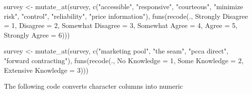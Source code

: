 \documentclass[
]{article}
\newenvironment{Shaded}{\begin{snugshade}}{\end{snugshade}}
\newcommand{\AttributeTok}[1]{\textcolor[rgb]{0.77,0.63,0.00}{#1}}
\newcommand{\DecValTok}[1]{\textcolor[rgb]{0.00,0.00,0.81}{#1}}
\newcommand{\FunctionTok}[1]{\textcolor[rgb]{0.00,0.00,0.00}{#1}}
\newcommand{\NormalTok}[1]{#1}
\newcommand{\OtherTok}[1]{\textcolor[rgb]{0.56,0.35,0.01}{#1}}
\newcommand{\StringTok}[1]{\textcolor[rgb]{0.31,0.60,0.02}{#1}}
\begin{document}
\begin{Shaded}
\begin{Highlighting}[]
\NormalTok{survey }\OtherTok{\textless{}{-}} \FunctionTok{mutate\_at}\NormalTok{(survey, }\FunctionTok{c}\NormalTok{(}\StringTok{"accessible"}\NormalTok{, }\StringTok{"responsive"}\NormalTok{, }\StringTok{"courteous"}\NormalTok{,}
    \StringTok{"minimize risk"}\NormalTok{, }\StringTok{"control"}\NormalTok{, }\StringTok{"reliability"}\NormalTok{, }\StringTok{"price information"}\NormalTok{),}
    \FunctionTok{funs}\NormalTok{(}\FunctionTok{recode}\NormalTok{(., }\StringTok{\textasciigrave{}}\AttributeTok{Strongly Disagree}\StringTok{\textasciigrave{}} \OtherTok{=} \DecValTok{1}\NormalTok{, }\AttributeTok{Disagree =} \DecValTok{2}\NormalTok{, }\StringTok{\textasciigrave{}}\AttributeTok{Somewhat Disagree}\StringTok{\textasciigrave{}} \OtherTok{=} \DecValTok{3}\NormalTok{,}
        \StringTok{\textasciigrave{}}\AttributeTok{Somewhat Agree}\StringTok{\textasciigrave{}} \OtherTok{=} \DecValTok{4}\NormalTok{, }\AttributeTok{Agree =} \DecValTok{5}\NormalTok{, }\StringTok{\textasciigrave{}}\AttributeTok{Strongly Agree}\StringTok{\textasciigrave{}} \OtherTok{=} \DecValTok{6}\NormalTok{)))}

\NormalTok{survey }\OtherTok{\textless{}{-}} \FunctionTok{mutate\_at}\NormalTok{(survey, }\FunctionTok{c}\NormalTok{(}\StringTok{"marketing pool"}\NormalTok{, }\StringTok{"the seam"}\NormalTok{, }\StringTok{"pcca direct"}\NormalTok{,}
    \StringTok{"forward contracting"}\NormalTok{), }\FunctionTok{funs}\NormalTok{(}\FunctionTok{recode}\NormalTok{(., }\StringTok{\textasciigrave{}}\AttributeTok{No Knowledge}\StringTok{\textasciigrave{}} \OtherTok{=} \DecValTok{1}\NormalTok{,}
    \StringTok{\textasciigrave{}}\AttributeTok{Some Knowledge}\StringTok{\textasciigrave{}} \OtherTok{=} \DecValTok{2}\NormalTok{, }\StringTok{\textasciigrave{}}\AttributeTok{Extensive Knowledge}\StringTok{\textasciigrave{}} \OtherTok{=} \DecValTok{3}\NormalTok{)))}
\end{Highlighting}
\end{Shaded}

The following code converts character columns into numeric
\end{document}
